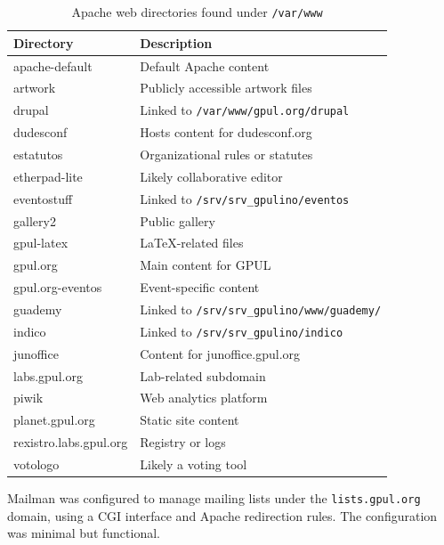 \begin{table}[H]
  \centering
  \caption{Apache web directories found under \texttt{/var/www}}
  \label{tab:gpulino_www_dirs}
  \begin{tabular}{ll}
    \rowcolor{udcpink!25}
    \textbf{Directory} & \textbf{Description} \\
    \hline
    apache-default & Default Apache content \\
    artwork & Publicly accessible artwork files \\
    drupal & Linked to \texttt{/var/www/gpul.org/drupal} \\
    dudesconf & Hosts content for dudesconf.org \\
    estatutos & Organizational rules or statutes \\
    etherpad-lite & Likely collaborative editor \\
    eventostuff & Linked to \verb|/srv/srv_gpulino/eventos| \\
    gallery2 & Public gallery \\
    gpul-latex & LaTeX-related files \\
    gpul.org & Main content for GPUL \\
    gpul.org-eventos & Event-specific content \\
    guademy & Linked to \verb|/srv/srv_gpulino/www/guademy/| \\
    indico & Linked to \verb|/srv/srv_gpulino/indico| \\
    junoffice & Content for junoffice.gpul.org \\
    labs.gpul.org & Lab-related subdomain \\
    piwik & Web analytics platform \\
    planet.gpul.org & Static site content \\
    rexistro.labs.gpul.org & Registry or logs \\
    votologo & Likely a voting tool \\
  \end{tabular}
\end{table}

Mailman was configured to manage mailing lists under the \texttt{lists.gpul.org} domain, using a CGI interface and Apache redirection rules. The configuration was minimal but functional.

